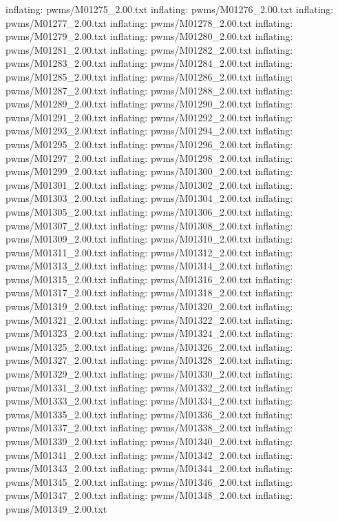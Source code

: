 \documentclass[letterpaper,10pt,english]{sphinxmanual}
\begin{document}
{\begin{sphinxVerbatim}[commandchars=\\\{\}]
  inflating: pwms/M01275\_2.00.txt
  inflating: pwms/M01276\_2.00.txt
  inflating: pwms/M01277\_2.00.txt
  inflating: pwms/M01278\_2.00.txt
  inflating: pwms/M01279\_2.00.txt
  inflating: pwms/M01280\_2.00.txt
  inflating: pwms/M01281\_2.00.txt
  inflating: pwms/M01282\_2.00.txt
  inflating: pwms/M01283\_2.00.txt
  inflating: pwms/M01284\_2.00.txt
  inflating: pwms/M01285\_2.00.txt
  inflating: pwms/M01286\_2.00.txt
  inflating: pwms/M01287\_2.00.txt
  inflating: pwms/M01288\_2.00.txt
  inflating: pwms/M01289\_2.00.txt
  inflating: pwms/M01290\_2.00.txt
  inflating: pwms/M01291\_2.00.txt
  inflating: pwms/M01292\_2.00.txt
  inflating: pwms/M01293\_2.00.txt
  inflating: pwms/M01294\_2.00.txt
  inflating: pwms/M01295\_2.00.txt
  inflating: pwms/M01296\_2.00.txt
  inflating: pwms/M01297\_2.00.txt
  inflating: pwms/M01298\_2.00.txt
  inflating: pwms/M01299\_2.00.txt
  inflating: pwms/M01300\_2.00.txt
  inflating: pwms/M01301\_2.00.txt
  inflating: pwms/M01302\_2.00.txt
  inflating: pwms/M01303\_2.00.txt
  inflating: pwms/M01304\_2.00.txt
  inflating: pwms/M01305\_2.00.txt
  inflating: pwms/M01306\_2.00.txt
  inflating: pwms/M01307\_2.00.txt
  inflating: pwms/M01308\_2.00.txt
  inflating: pwms/M01309\_2.00.txt
  inflating: pwms/M01310\_2.00.txt
  inflating: pwms/M01311\_2.00.txt
  inflating: pwms/M01312\_2.00.txt
  inflating: pwms/M01313\_2.00.txt
  inflating: pwms/M01314\_2.00.txt
  inflating: pwms/M01315\_2.00.txt
  inflating: pwms/M01316\_2.00.txt
  inflating: pwms/M01317\_2.00.txt
  inflating: pwms/M01318\_2.00.txt
  inflating: pwms/M01319\_2.00.txt
  inflating: pwms/M01320\_2.00.txt
  inflating: pwms/M01321\_2.00.txt
  inflating: pwms/M01322\_2.00.txt
  inflating: pwms/M01323\_2.00.txt
  inflating: pwms/M01324\_2.00.txt
  inflating: pwms/M01325\_2.00.txt
  inflating: pwms/M01326\_2.00.txt
  inflating: pwms/M01327\_2.00.txt
  inflating: pwms/M01328\_2.00.txt
  inflating: pwms/M01329\_2.00.txt
  inflating: pwms/M01330\_2.00.txt
  inflating: pwms/M01331\_2.00.txt
  inflating: pwms/M01332\_2.00.txt
  inflating: pwms/M01333\_2.00.txt
  inflating: pwms/M01334\_2.00.txt
  inflating: pwms/M01335\_2.00.txt
  inflating: pwms/M01336\_2.00.txt
  inflating: pwms/M01337\_2.00.txt
  inflating: pwms/M01338\_2.00.txt
  inflating: pwms/M01339\_2.00.txt
  inflating: pwms/M01340\_2.00.txt
  inflating: pwms/M01341\_2.00.txt
  inflating: pwms/M01342\_2.00.txt
  inflating: pwms/M01343\_2.00.txt
  inflating: pwms/M01344\_2.00.txt
  inflating: pwms/M01345\_2.00.txt
  inflating: pwms/M01346\_2.00.txt
  inflating: pwms/M01347\_2.00.txt
  inflating: pwms/M01348\_2.00.txt
  inflating: pwms/M01349\_2.00.txt

\end{sphinxVerbatim}}
\end{document}

